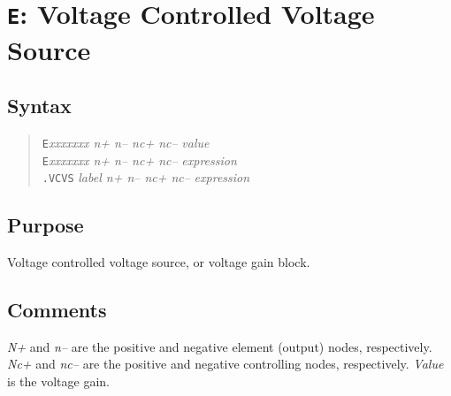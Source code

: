 %
%
%
%
\section{{\tt E}: Voltage Controlled Voltage Source}
\subsection{Syntax}
\begin{verse}
{\tt E}{\it xxxxxxx n+ n-- nc+ nc--} {\it value}\\
{\tt E}{\it xxxxxxx n+ n-- nc+ nc--} {\it expression}\\
{\tt .VCVS} {\it label n+ n-- nc+ nc--} {\it expression}
\end{verse}
\subsection{Purpose}

Voltage controlled voltage source, or voltage gain block.
\subsection{Comments}

{\it N+} and {\it n--} are the positive and negative element (output) nodes,
respectively.  {\it Nc+} and {\it nc--} are the positive and negative
controlling nodes, respectively.  {\it Value} is the voltage gain.
